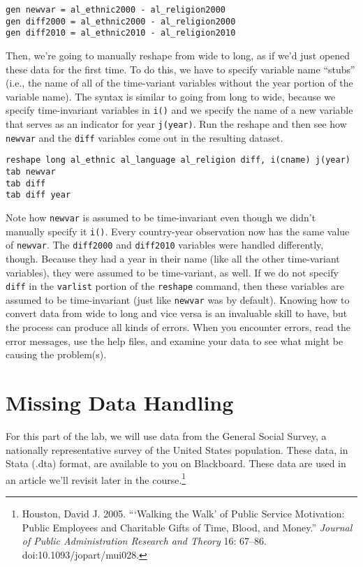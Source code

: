 \documentclass[a4paper,12pt]{article}
\begin{document}
\begin{enumerate}
\begin{verbatim}
gen newvar = al_ethnic2000 - al_religion2000
gen diff2000 = al_ethnic2000 - al_religion2000
gen diff2010 = al_ethnic2010 - al_religion2010
\end{verbatim}

\noindent Then, we're going to manually reshape from wide to long, as if we'd just opened these data for the first time. To do this, we have to specify variable name ``stubs'' (i.e., the name of all of the time-variant variables without the year portion of the variable name). The syntax is similar to going from long to wide, because we specify time-invariant variables in \texttt{i()} and we specify the name of a new variable that serves as an indicator for year \texttt{j(year)}. Run the reshape and then see how \texttt{newvar} and the \texttt{diff} variables come out in the resulting dataset.

\begin{verbatim}
reshape long al_ethnic al_language al_religion diff, i(cname) j(year)
tab newvar
tab diff
tab diff year
\end{verbatim}

\noindent Note how \texttt{newvar} is assumed to be time-invariant even though we didn't manually specify it \texttt{i()}. Every country-year observation now has the same value of \texttt{newvar}. The \texttt{diff2000} and \texttt{diff2010} variables were handled differently, though. Because they had a year in their name (like all the other time-variant variables), they were assumed to be time-variant, as well. If we do not specify \texttt{diff} in the \texttt{varlist} portion of the \texttt{reshape} command, then these variables are assumed to be time-invariant (just like \texttt{newvar} was by default). Knowing how to convert data from wide to long and vice versa is an invaluable skill to have, but the process can produce all kinds of errors. When you encounter errors, read the error messages, use the help files, and examine your data to see what might be causing the problem(s).


\section*{Missing Data Handling}

For this part of the lab, we will use data from the General Social Survey, a nationally representative survey of the United States population. These data, in Stata (.dta) format, are available to you on Blackboard. These data are used in an article we'll revisit later in the course.\footnote{Houston, David J. 2005. ```Walking the Walk' of Public Service Motivation: Public Employees and Charitable Gifts of Time, Blood, and Money.'' {\em Journal of Public Administration Research and Theory} 16: 67--86. doi:10.1093/jopart/mui028.}


\end{enumerate}
\end{document}
